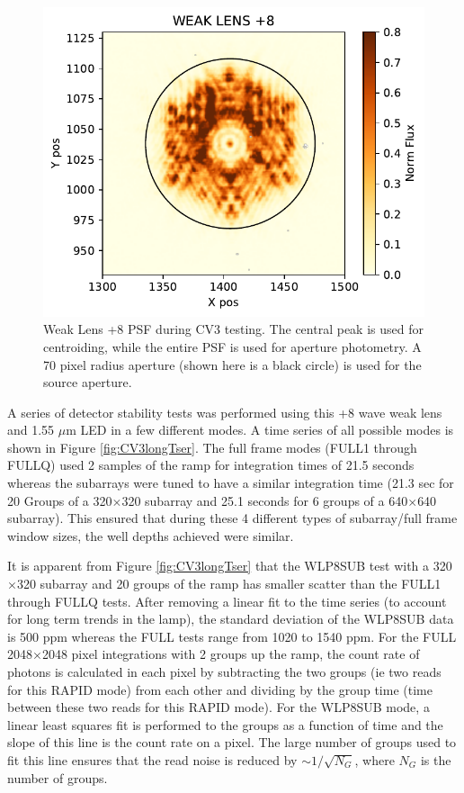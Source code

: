 \documentclass{aastex62}
\begin{document}
\begin{figure}[!hbtp]
\centering
\includegraphics[width=.49\columnwidth]{wlp8_psf.pdf}
\caption{Weak Lens +8 PSF during CV3 testing.
The central peak is used for centroiding, while the entire PSF is used for aperture photometry.
A 70 pixel radius aperture (shown here is a black circle) is used for the source aperture.}\label{fig:WLP8PSF}
\end{figure}

A series of detector stability tests was performed using this +8 wave weak lens and 1.55 $\mu$m LED in a few different modes.
A time series of all possible modes is shown in Figure \ref{fig:CV3longTser}.
The full frame modes (FULL1 through FULLQ) used 2 samples of the ramp for integration times of 21.5 seconds whereas the subarrays were tuned to have a similar integration time (21.3 sec for 20 Groups of a 320$\times$320 subarray and 25.1 seconds for 6 groups of a 640$\times$640 subarray).
This ensured that during these 4 different types of subarray/full frame window sizes, the well depths achieved were similar.

It is apparent from Figure \ref{fig:CV3longTser} that the WLP8SUB test with a 320$\times$320 subarray and 20 groups of the ramp has smaller scatter than the FULL1 through FULLQ tests.
After removing a linear fit to the time series (to account for long term trends in the lamp), the standard deviation of the WLP8SUB data is 500 ppm whereas the FULL tests range from 1020 to 1540 ppm.
For the FULL 2048$\times$2048 pixel integrations with 2 groups up the ramp, the count rate of photons is calculated in each pixel by subtracting the two groups (ie two reads for this RAPID mode) from each other and dividing by the group time (time between these two reads for this RAPID mode).
For the WLP8SUB mode, a linear least squares fit is performed to the groups as a function of time and the slope of this line is the count rate on a pixel.
The large number of groups used to fit this line ensures that the read noise is reduced by $\sim 1/\sqrt{N_G}$, where $N_G$ is the number of groups.
\end{document}
